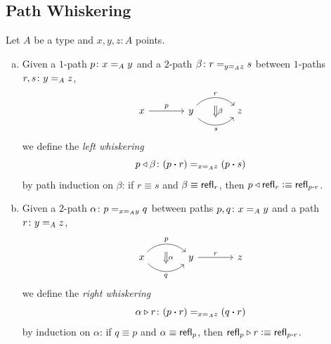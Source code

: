 \subsection{Path Whiskering}

\begin{defn}\label{defn:path-whiskering}
    Let $A$ be a type and $x,y,z\colon A$ points.
    \begin{enumerate}[a),font=\upshape]
        \item Given a $1$-path $p\colon x\eq Ay$ and a $2$-path $\beta\colon r\eq{y\eq Az}s$ between $1$-paths $r,s\colon y\eq Az$,
        \[
            \begin{tikzcd}[column sep=large,
                row sep=huge]
                x 
                        \arrow[r,"p"]
                    &y
                        \arrow[r,bend left=45,"r"{name=U}]
                        \arrow[r,bend right=45,"s"'{name=D}]
                    &z
                        \arrow[Rightarrow,
                            from=U,
                            to=D,
                            "\beta", 
                            shorten <= 8pt,
                            shorten >= 8pt]
            \end{tikzcd}
        \]
        we define the \textsl{left whiskering}
        \[
            p\lwct\beta\colon(p\ct r)\eq{x\eq Az}(p\ct s)
        \]
        by path induction on $\beta$: if $r\equiv s$ and $\beta\equiv\mathsf{refl}_r$, then $p\triangleleft\mathsf{refl}_r\mathrel{\vcentcolon}\equiv\mathsf{refl}_{p\mathbin{\boldsymbol{\cdot}} r}$.
        
        \item Given a $2$-path $\alpha\colon p\eq{x\eq Ay}q$ between paths $p,q\colon x\eq Ay$ and a path $r\colon y\eq Az$,
        \[
            \begin{tikzcd}[column sep=large,
                row sep=huge]
                x
                        \arrow[r,bend left=45,"p"{name=U}]
                        \arrow[r,bend right=45,"q"'{name=D}]
                    &y 
                        \arrow[r, "r"]
                    &z
                        \arrow[Rightarrow,
                            from=U,
                            to=D,
                            "\alpha", 
                            shorten <= 8pt,
                            shorten >= 8pt]
            \end{tikzcd}
        \]
        we define the \textsl{right whiskering}
        \[
            \alpha\rwct r\colon(p\ct r)\eq{x\eq Az}(q\ct r)
        \]
        by induction on $\alpha$: if $q\equiv p$ and $\alpha\equiv\mathsf{refl}_p$, then $\mathsf{refl}_p\triangleright r\mathrel{\vcentcolon}\equiv\mathsf{refl}_{p\mathbin{\boldsymbol{\cdot}} r}$.
    \end{enumerate}
\end{defn}

